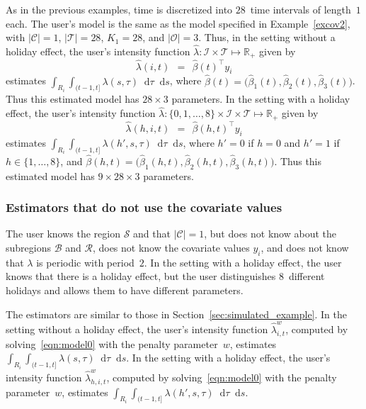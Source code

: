 \documentclass[article]{jss}
\newcommand{\RR}{\mathbb{R}}
\def\diff{\mathop{}\!\mathrm{d}}
\begin{document}
As in the previous examples, time is discretized into $28$~time intervals of length~$1$ each.
The user's model is the same as the model specified in Example~\ref{excov2}, with $|\mathcal{C}| = 1$, $|\mathcal{T}| = 28$, $K_{1} = 28$, and $|\mathcal{O}| = 3$.
Thus, in the setting without a holiday effect, the user's intensity function $\hat{\lambda} : \mathcal{I} \times \mathcal{T} \mapsto \RR_{+}$ given by
\[
\hat{\lambda}(i,t) \ \ = \ \ \hat{\beta}(t)^{\top} y_{i}
\]
estimates $\displaystyle \int_{R_{i}} \int_{(t-1,t]} \lambda(s,\tau) \diff \tau \diff s$, where $\hat{\beta}(t) = \big(\hat{\beta}_{1}(t),\hat{\beta}_{2}(t),\hat{\beta}_{3}(t)\big)$.
Thus this estimated model has $28 \times 3$ parameters.
In the setting with a holiday effect, the user's intensity function $\hat{\lambda} : \{0,1,\ldots,8\} \times \mathcal{I} \times \mathcal{T} \mapsto \RR_{+}$ given by
\[
\hat{\lambda}(h,i,t) \ \ = \ \ \hat{\beta}(h,t)^{\top} y_{i}
\]
estimates $\displaystyle \int_{R_{i}} \int_{(t-1,t]} \lambda(h',s,\tau) \diff \tau \diff s$, where $h' = 0$ if $h = 0$ and $h' = 1$ if $h \in \{1,\ldots,8\}$, and $\hat{\beta}(h,t) = \big(\hat{\beta}_{1}(h,t),\hat{\beta}_{2}(h,t),\hat{\beta}_{3}(h,t)\big)$.
Thus this estimated model has $9 \times 28 \times 3$ parameters.


\subsubsection{Estimators that do not use the covariate values}

The user knows the region $\mathcal{S}$ and that $|\mathcal{C}| = 1$, but does not know about the  subregions $\mathcal{B}$ and $\mathcal{R}$, does not know the covariate values $y_{i}$, and does not know that $\lambda$ is periodic with period~$2$.
In the setting with a holiday effect, the user knows that there is a holiday effect, but the user distinguishes $8$~different holidays and allows them to have different parameters.

The estimators are similar to those in Section~\ref{sec:simulated_example}.
In the setting without a holiday effect, the user's intensity function $\hat{\lambda}^{w}_{i,t}$, computed by solving~\eqref{eqn:model0} with the penalty parameter~$w$, estimates $\displaystyle \int_{R_{i}} \int_{(t-1,t]} \lambda(s,\tau) \diff \tau \diff s$.
In the setting with a holiday effect, the user's intensity function $\hat{\lambda}^{w}_{h,i,t}$, computed by solving~\eqref{eqn:model0} with the penalty parameter~$w$, estimates $\displaystyle \int_{R_{i}} \int_{(t-1,t]} \lambda(h',s,\tau) \diff \tau \diff s$.
\end{document}
